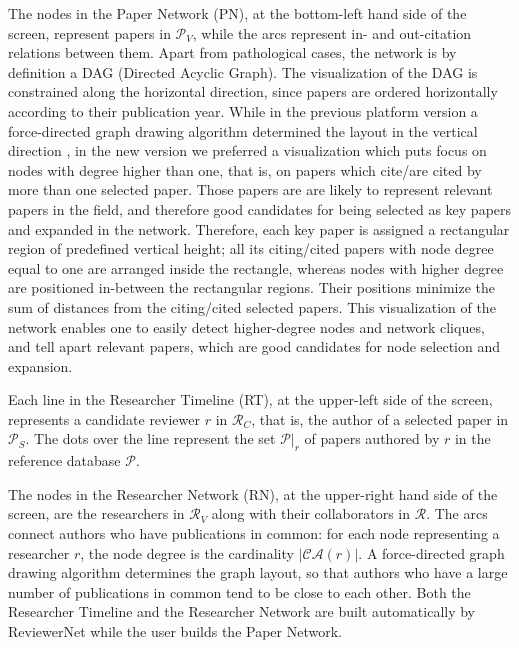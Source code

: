 The nodes in the Paper Network (PN), at the bottom-left hand side of the screen, represent papers in $\mathcal{P}_{V}$, while the arcs represent in- and out-citation relations between them. Apart from pathological cases, the network is by definition a DAG (Directed Acyclic Graph). The visualization of the DAG is constrained along the horizontal direction, since papers are ordered horizontally according to their publication year. While in the previous platform version \cite{stag19} a force-directed graph drawing algorithm determined the layout in the vertical direction \cite{D3js11}, in the new version we preferred a visualization which puts focus on nodes with degree higher than one, that is, on papers which cite/are cited by more than one selected paper. Those papers are are likely to represent relevant papers in the field, and therefore good candidates for being selected as key papers and expanded in the network. Therefore, each key paper is assigned a rectangular region of predefined vertical height; all its citing/cited papers with node degree equal to one are arranged inside the rectangle, whereas nodes with higher degree are positioned in-between the rectangular regions. Their positions minimize the sum of distances from the citing/cited selected papers. This visualization of the network enables one to easily detect higher-degree nodes and network cliques, and tell apart relevant papers, which are good candidates for node selection and expansion. 

Each line in the Researcher Timeline (RT), at the upper-left side of the screen, represents a candidate reviewer $r$ in $\mathcal{R}_{C}$, that is, the author of a selected paper in $\mathcal{P}_{S}$. The dots over the line represent the set $\mathcal{P}|_{r}$ of papers authored by $r$ in the reference database $\mathcal{P}$. %

The nodes in the Researcher Network (RN), at the upper-right hand side of the screen, are the researchers in $\mathcal{R}_V$ along with their collaborators in $\mathcal{R}$. The arcs connect authors who have publications in common: for each node representing a researcher $r$, the node degree is the cardinality $\vert \mathcal{CA}(r) \vert$. A force-directed graph drawing algorithm determines the graph layout, so that authors who have a large number of publications in common tend to be close to each other. Both the Researcher Timeline and the Researcher Network are built automatically by ReviewerNet while the user builds the Paper Network.  

